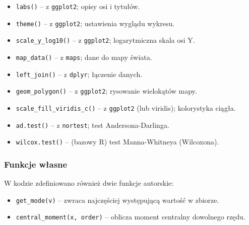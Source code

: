 \documentclass[polish]{article}
\begin{document}
\begin{itemize}
        \item \texttt{labs()} -- z \texttt{ggplot2}; opisy osi i tytułów.
        \item \texttt{theme()} -- z \texttt{ggplot2}; ustawienia wyglądu wykresu.
        \item \texttt{scale\_y\_log10()} -- z \texttt{ggplot2}; logarytmiczna skala osi Y.
        \item \texttt{map\_data()} -- z \texttt{maps}; dane do mapy świata.
        \item \texttt{left\_join()} -- z \texttt{dplyr}; łączenie danych.
        \item \texttt{geom\_polygon()} -- z \texttt{ggplot2}; rysowanie wielokątów mapy.
        \item \texttt{scale\_fill\_viridis\_c()} -- z \texttt{ggplot2} (lub viridis); kolorystyka ciągła.
        \item \texttt{ad.test()} -- z \texttt{nortest}; test Andersona-Darlinga.
        \item \texttt{wilcox.test()} -- (bazowy R) test Manna-Whitneya (Wilcoxona).
    \end{itemize}

    \subsubsection*{Funkcje własne}

    W kodzie zdefiniowano również dwie funkcje autorskie:

    \begin{itemize}
        \item \texttt{get\_mode(v)} -- zwraca najczęściej występującą wartość w zbiorze.
        \item \texttt{central\_moment(x, order)} -- oblicza moment centralny dowolnego rzędu.
    \end{itemize}

    \newpage
\end{document}
